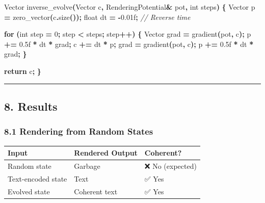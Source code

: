 \documentclass[
  11pt,
  a4paper,
]{article}
\newenvironment{Shaded}{\begin{snugshade}}{\end{snugshade}}
\newcommand{\BuiltInTok}[1]{#1}
\newcommand{\CommentTok}[1]{\textcolor[rgb]{0.56,0.35,0.01}{\textit{#1}}}
\newcommand{\ControlFlowTok}[1]{\textcolor[rgb]{0.13,0.29,0.53}{\textbf{#1}}}
\newcommand{\DataTypeTok}[1]{\textcolor[rgb]{0.13,0.29,0.53}{#1}}
\newcommand{\DecValTok}[1]{\textcolor[rgb]{0.00,0.00,0.81}{#1}}
\newcommand{\FloatTok}[1]{\textcolor[rgb]{0.00,0.00,0.81}{#1}}
\newcommand{\NormalTok}[1]{#1}
\newcommand{\OperatorTok}[1]{\textcolor[rgb]{0.81,0.36,0.00}{\textbf{#1}}}
\begin{document}
\begin{Shaded}
\begin{Highlighting}[]
\NormalTok{Vector inverse\_evolve}\OperatorTok{(}\NormalTok{Vector c}\OperatorTok{,}\NormalTok{ RenderingPotential}\OperatorTok{\&}\NormalTok{ pot}\OperatorTok{,} \DataTypeTok{int}\NormalTok{ steps}\OperatorTok{)} \OperatorTok{\{}
\NormalTok{    Vector p }\OperatorTok{=}\NormalTok{ zero\_vector}\OperatorTok{(}\NormalTok{c}\OperatorTok{.}\NormalTok{size}\OperatorTok{());}
    \DataTypeTok{float}\NormalTok{ dt }\OperatorTok{=} \OperatorTok{{-}}\FloatTok{0.01}\BuiltInTok{f}\OperatorTok{;}  \CommentTok{// Reverse time}
    
    \ControlFlowTok{for} \OperatorTok{(}\DataTypeTok{int}\NormalTok{ step }\OperatorTok{=} \DecValTok{0}\OperatorTok{;}\NormalTok{ step }\OperatorTok{\textless{}}\NormalTok{ steps}\OperatorTok{;}\NormalTok{ step}\OperatorTok{++)} \OperatorTok{\{}
\NormalTok{        Vector grad }\OperatorTok{=}\NormalTok{ gradient}\OperatorTok{(}\NormalTok{pot}\OperatorTok{,}\NormalTok{ c}\OperatorTok{);}
\NormalTok{        p }\OperatorTok{+=} \FloatTok{0.5}\BuiltInTok{f} \OperatorTok{*}\NormalTok{ dt }\OperatorTok{*}\NormalTok{ grad}\OperatorTok{;}
\NormalTok{        c }\OperatorTok{+=}\NormalTok{ dt }\OperatorTok{*}\NormalTok{ p}\OperatorTok{;}
\NormalTok{        grad }\OperatorTok{=}\NormalTok{ gradient}\OperatorTok{(}\NormalTok{pot}\OperatorTok{,}\NormalTok{ c}\OperatorTok{);}
\NormalTok{        p }\OperatorTok{+=} \FloatTok{0.5}\BuiltInTok{f} \OperatorTok{*}\NormalTok{ dt }\OperatorTok{*}\NormalTok{ grad}\OperatorTok{;}
    \OperatorTok{\}}
    
    \ControlFlowTok{return}\NormalTok{ c}\OperatorTok{;}
\OperatorTok{\}}
\end{Highlighting}
\end{Shaded}

\begin{center}\rule{0.5\linewidth}{0.5pt}\end{center}

\subsection{8. Results}\label{results}

\subsubsection{8.1 Rendering from Random
States}\label{rendering-from-random-states}

\begin{longtable}[]{@{}lll@{}}
\toprule\noalign{}
Input & Rendered Output & Coherent? \\
\midrule\noalign{}
\endhead
\bottomrule\noalign{}
\endlastfoot
Random state & Garbage & ❌ No (expected) \\
Text-encoded state & Text & ✅ Yes \\
Evolved state & Coherent text & ✅ Yes \\
\end{longtable}
\end{document}
